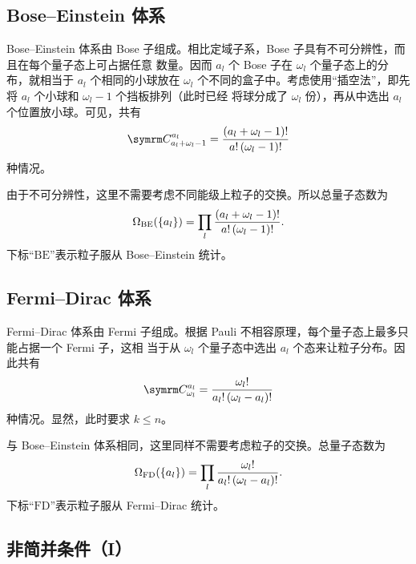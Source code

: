 \subsection{Bose--Einstein 体系} \label{subsec:bose-einstein-system}

Bose--Einstein 体系由 Bose 子组成。相比定域子系，Bose 子具有不可分辨性，而且在每个量子态上可占据任意
数量。因而 $a_l$ 个 Bose 子在 $\omega_l$ 个量子态上的分布，就相当于 $a_l$ 个相同的小球放在
$\omega_l$ 个不同的盒子中。考虑使用“插空法”，即先将 $a_l$ 个小球和 $\omega_l-1$ 个挡板排列（此时已经
将球分成了 $\omega_l$ 份），再从中选出 $a_l$ 个位置放小球。可见，共有
\begin{equation}
  \Cnum{a_l+\omega_l-1}{a_l} = \frac{\qty(a_l+\omega_l-1)!}{a! \, \qty(\omega_l-1)!}
\end{equation}
种情况。

由于不可分辨性，这里不需要考虑不同能级上粒子的交换。所以总量子态数为
\begin{equation} \label{eq:number-of-states-in-bose-dist}
  \Omega_\text{BE}(\qty{a_l}) = \prod_l \frac{\qty(a_l+\omega_l-1)!}{a! \, \qty(\omega_l-1)!}.
\end{equation}
下标“$\text{BE}$”表示粒子服从 Bose--Einstein 统计。

\subsection{Fermi--Dirac 体系}

Fermi--Dirac 体系由 Fermi 子组成。根据 Pauli 不相容原理，每个量子态上最多只能占据一个 Fermi 子，这相
当于从 $\omega_l$ 个量子态中选出 $a_l$ 个态来让粒子分布。因此共有
\begin{equation}
  \Cnum{\omega_l}{a_l} = \frac{\omega_l!}{a_l! \, \qty(\omega_l-a_l)!}
\end{equation}
种情况。显然，此时要求 $k \leqslant n$。

与 Bose--Einstein 体系相同，这里同样不需要考虑粒子的交换。总量子态数为
\begin{equation} \label{eq:number-of-states-in-fermi-dist}
  \Omega_\text{FD}(\qty{a_l}) = \prod_l \frac{\omega_l!}{a_l! \, \qty(\omega_l-a_l)!}.
\end{equation}
下标“$\text{FD}$”表示粒子服从 Fermi--Dirac 统计。

\subsection{非简并条件（I）} \label{subsec:non-degenerate-condition-i}

